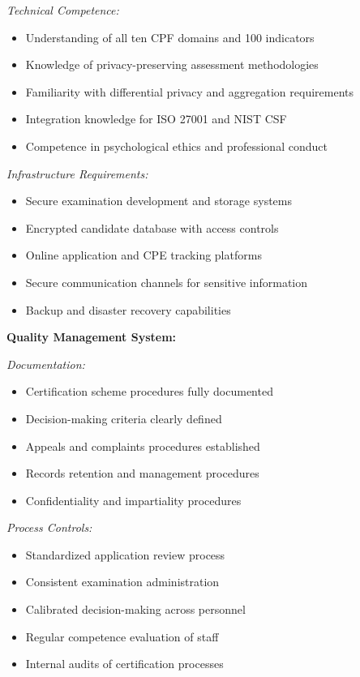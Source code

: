 \documentclass[11pt,a4paper]{article}
\begin{document}
\textit{Technical Competence:}
\begin{itemize}
\item Understanding of all ten CPF domains and 100 indicators
\item Knowledge of privacy-preserving assessment methodologies
\item Familiarity with differential privacy and aggregation requirements
\item Integration knowledge for ISO 27001 and NIST CSF
\item Competence in psychological ethics and professional conduct
\end{itemize}

\textit{Infrastructure Requirements:}
\begin{itemize}
\item Secure examination development and storage systems
\item Encrypted candidate database with access controls
\item Online application and CPE tracking platforms
\item Secure communication channels for sensitive information
\item Backup and disaster recovery capabilities
\end{itemize}

\textbf{Quality Management System:}

\textit{Documentation:}
\begin{itemize}
\item Certification scheme procedures fully documented
\item Decision-making criteria clearly defined
\item Appeals and complaints procedures established
\item Records retention and management procedures
\item Confidentiality and impartiality procedures
\end{itemize}

\textit{Process Controls:}
\begin{itemize}
\item Standardized application review process
\item Consistent examination administration
\item Calibrated decision-making across personnel
\item Regular competence evaluation of staff
\item Internal audits of certification processes
\end{itemize}
\end{document}
